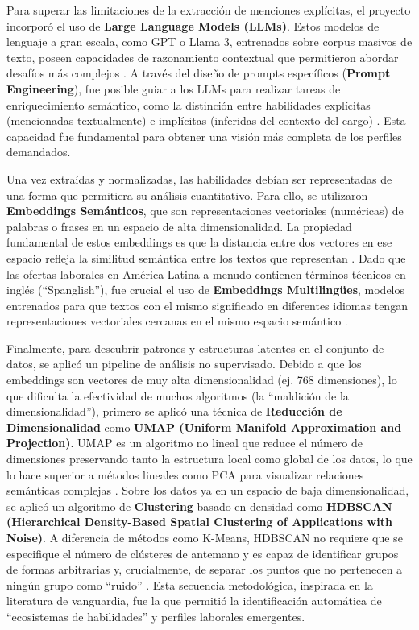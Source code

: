 Para superar las limitaciones de la extracción de menciones explícitas, el proyecto incorporó el uso de \textbf{Large Language Models (LLMs)}. Estos modelos de lenguaje a gran escala, como GPT o Llama 3, entrenados sobre corpus masivos de texto, poseen capacidades de razonamiento contextual que permitieron abordar desafíos más complejos \parencite{herandi2024}. A través del diseño de prompts específicos (\textbf{Prompt Engineering}), fue posible guiar a los LLMs para realizar tareas de enriquecimiento semántico, como la distinción entre habilidades explícitas (mencionadas textualmente) e implícitas (inferidas del contexto del cargo) \parencite{nguyen2024}. Esta capacidad fue fundamental para obtener una visión más completa de los perfiles demandados.

Una vez extraídas y normalizadas, las habilidades debían ser representadas de una forma que permitiera su análisis cuantitativo. Para ello, se utilizaron \textbf{Embeddings Semánticos}, que son representaciones vectoriales (numéricas) de palabras o frases en un espacio de alta dimensionalidad. La propiedad fundamental de estos embeddings es que la distancia entre dos vectores en ese espacio refleja la similitud semántica entre los textos que representan \parencite{kavas2024}. Dado que las ofertas laborales en América Latina a menudo contienen términos técnicos en inglés (``Spanglish''), fue crucial el uso de \textbf{Embeddings Multilingües}, modelos entrenados para que textos con el mismo significado en diferentes idiomas tengan representaciones vectoriales cercanas en el mismo espacio semántico \parencite{echeverria2022}.

Finalmente, para descubrir patrones y estructuras latentes en el conjunto de datos, se aplicó un pipeline de análisis no supervisado. Debido a que los embeddings son vectores de muy alta dimensionalidad (ej. 768 dimensiones), lo que dificulta la efectividad de muchos algoritmos (la ``maldición de la dimensionalidad''), primero se aplicó una técnica de \textbf{Reducción de Dimensionalidad} como \textbf{UMAP (Uniform Manifold Approximation and Projection)}. UMAP es un algoritmo no lineal que reduce el número de dimensiones preservando tanto la estructura local como global de los datos, lo que lo hace superior a métodos lineales como PCA para visualizar relaciones semánticas complejas \parencite{lukauskas2023}. Sobre los datos ya en un espacio de baja dimensionalidad, se aplicó un algoritmo de \textbf{Clustering} basado en densidad como \textbf{HDBSCAN (Hierarchical Density-Based Spatial Clustering of Applications with Noise)}. A diferencia de métodos como K-Means, HDBSCAN no requiere que se especifique el número de clústeres de antemano y es capaz de identificar grupos de formas arbitrarias y, crucialmente, de separar los puntos que no pertenecen a ningún grupo como ``ruido'' \parencite{lukauskas2023}. Esta secuencia metodológica, inspirada en la literatura de vanguardia, fue la que permitió la identificación automática de ``ecosistemas de habilidades'' y perfiles laborales emergentes.

